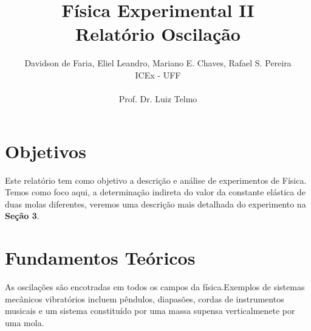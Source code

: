 \documentclass{article}
\begin{document}


\title{Física Experimental II \\ Relatório Oscilação}

\author{Davidson de Faria, Eliel Leandro, Mariano E. Chaves, Rafael S. Pereira \\  ICEx - UFF \\ \\ Prof. Dr. Luiz Telmo}
\maketitle
\newpage

\section{Objetivos}

Este relatório tem como objetivo a descrição e análise de experimentos de Física. Temos como foco aqui, a determinação indireta do valor da constante elástica de duas molas diferentes, veremos uma descrição mais detalhada do experimento na \textbf{Seção 3}.

\section{Fundamentos Teóricos}

	As oscilações são encotradas em todos os campos da física.Exemplos de sistemas mecânicos vibratórios incluem pêndulos, diapasões, cordas de instrumentos musicais e um sistema constituído por uma massa supensa verticalmenete por uma mola.
\end{document}
